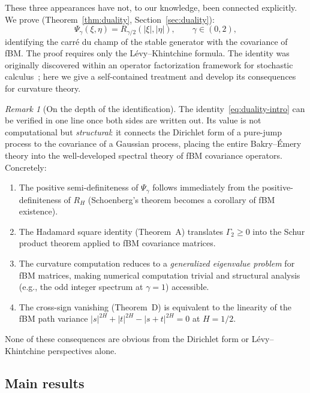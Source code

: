 \documentclass[11pt,a4paper]{article}
\theoremstyle{plain}
\theoremstyle{definition}
\theoremstyle{remark}
\newtheorem{remark}[theorem]{Remark}
\begin{document}
These three appearances have not, to our knowledge, been connected
explicitly.  We prove (Theorem~\ref{thm:duality},
Section~\ref{sec:duality}):
\begin{equation}\label{eq:duality-intro}
  \Psi_\gamma(\xi,\eta) = R_{\gamma/2}(|\xi|,|\eta|),
  \qquad \gamma \in (0,2),
\end{equation}
identifying the carr\'e du champ of the stable generator with
the covariance of fBM.  The proof requires only the
L\'evy--Khintchine formula.
The identity was originally discovered within an operator
factorization framework for stochastic
calculus~\cite{Fontes2026a}; here we give a self-contained
treatment and develop its consequences for curvature theory.

\begin{remark}[On the depth of the identification]
\label{rem:identification}
The identity~\eqref{eq:duality-intro} can be verified
in one line once both sides are written out. Its value
is not computational but \emph{structural}: it connects
the Dirichlet form of a pure-jump process to the
covariance of a Gaussian process, placing the entire
Bakry--\'Emery theory into the well-developed spectral
theory of fBM covariance operators. Concretely:
\begin{enumerate}[label=(\alph*)]
\item The positive semi-definiteness of $\Psi_\gamma$
  follows immediately from the positive-definiteness
  of $R_H$ (Schoenberg's theorem becomes a
  corollary of fBM existence).
\item The Hadamard square identity (Theorem~A)
  translates $\Gamma_2 \geq 0$ into the Schur product
  theorem applied to fBM covariance matrices.
\item The curvature computation reduces to a
  \emph{generalized eigenvalue problem} for fBM
  matrices, making numerical computation trivial
  and structural analysis (e.g., the odd integer
  spectrum at $\gamma = 1$) accessible.
\item The cross-sign vanishing (Theorem~D) is
  equivalent to the linearity of the fBM path
  variance $|s|^{2H} + |t|^{2H} - |s+t|^{2H} = 0$
  at $H = 1/2$.
\end{enumerate}
None of these consequences are obvious from the
Dirichlet form or L\'evy--Khintchine perspectives alone.
\end{remark}


\subsection{Main results}
\end{document}
